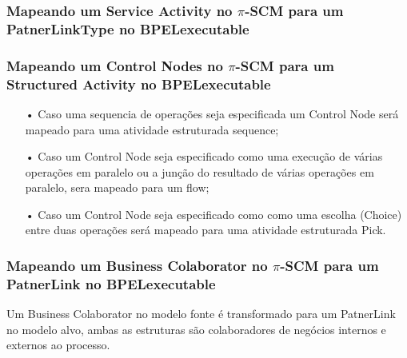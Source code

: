 \subsubsection{Mapeando um Service Activity no $\pi$-SCM para um PatnerLinkType no BPELexecutable}

%
\subsubsection{Mapeando um Control Nodes no $\pi$-SCM para um Structured Activity no BPELexecutable}


\begin{itemize}

\item[•] Caso uma sequencia de operações seja especificada um Control Node será mapeado para uma atividade estruturada sequence; 

\item[•] Caso um Control Node seja especificado como uma execução de várias operações em paralelo  ou a junção do resultado de várias operações em paralelo, sera mapeado para um flow;

\item[•] Caso um  Control Node seja especificado como como uma escolha (Choice) entre duas operações será mapeado para uma atividade estruturada Pick.

\end{itemize}

\subsubsection{Mapeando um Business Colaborator no $\pi$-SCM para um PatnerLink no BPELexecutable}

Um Business Colaborator no modelo fonte é transformado para um PatnerLink no modelo alvo, ambas as estruturas são colaboradores de negócios internos e externos ao processo.

